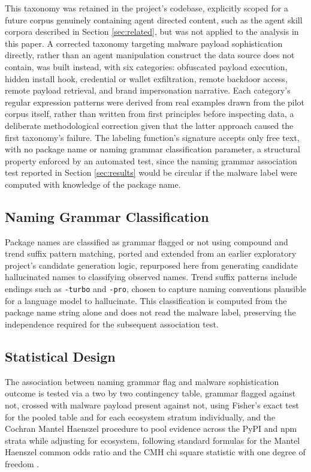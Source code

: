 \documentclass[journal]{IEEEtran}
\begin{document}
This taxonomy was retained in the project's codebase, explicitly scoped for a future corpus genuinely containing agent directed content, such as the agent skill corpora described in Section \ref{sec:related}, but was not applied to the analysis in this paper. A corrected taxonomy targeting malware payload sophistication directly, rather than an agent manipulation construct the data source does not contain, was built instead, with six categories: obfuscated payload execution, hidden install hook, credential or wallet exfiltration, remote backdoor access, remote payload retrieval, and brand impersonation narrative. Each category's regular expression patterns were derived from real examples drawn from the pilot corpus itself, rather than written from first principles before inspecting data, a deliberate methodological correction given that the latter approach caused the first taxonomy's failure. The labeling function's signature accepts only free text, with no package name or naming grammar classification parameter, a structural property enforced by an automated test, since the naming grammar association test reported in Section \ref{sec:results} would be circular if the malware label were computed with knowledge of the package name.

\subsection{Naming Grammar Classification}

Package names are classified as grammar flagged or not using compound and trend suffix pattern matching, ported and extended from an earlier exploratory project's candidate generation logic, repurposed here from generating candidate hallucinated names to classifying observed names. Trend suffix patterns include endings such as \texttt{-turbo} and \texttt{-pro}, chosen to capture naming conventions plausible for a language model to hallucinate. This classification is computed from the package name string alone and does not read the malware label, preserving the independence required for the subsequent association test.

\subsection{Statistical Design}

The association between naming grammar flag and malware sophistication outcome is tested via a two by two contingency table, grammar flagged against not, crossed with malware payload present against not, using Fisher's exact test for the pooled table and for each ecosystem stratum individually, and the Cochran Mantel Haenszel procedure to pool evidence across the PyPI and npm strata while adjusting for ecosystem, following standard formulas for the Mantel Haenszel common odds ratio and the CMH chi square statistic with one degree of freedom \cite{agresti}.
\end{document}
